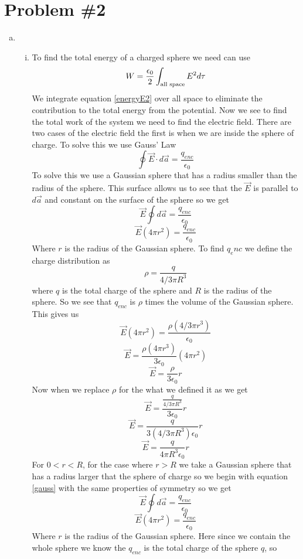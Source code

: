 \documentclass[11pt]{article}
\numberwithin{equation}{section}
\newcommand{\vecE}{\vec{E}}
\begin{document}
\section{Problem \#2}
\begin{enumerate}[(a)]
\item
\begin{enumerate}[(i)]
\item
To find the total energy of a charged sphere we need can use 
\begin{equation}
W = \frac{\epsilon_0}{2} \int_{\textnormal{all space}} E^2 d\tau
\label{energyE2}
\end{equation}
We integrate equation \ref{energyE2} over all space to eliminate the contribution to the total energy from the potential. Now we see to find the total work of the system we need to find the electric field. There are two cases of the electric field the first is when we are inside the sphere of charge. To solve this we use Gauss' Law
\begin{equation}
\oint \vecE\cdot d\vec{a} = \frac{q_{enc}}{\epsilon_0}
\label{gauss}
\end{equation}
To solve this we use a Gaussian sphere that has a radius smaller than the radius of the sphere. This surface allows us to see that the $\vecE$ is parallel to $d\vec{a}$ and constant on the surface of the sphere so we get
$$\vecE\oint d\vec{a} = \frac{q_{enc}}{\epsilon_0}$$
$$\vecE(4\pi r^2) = \frac{q_{enc}}{\epsilon_0}$$
Where $r$ is the radius of the Gaussian sphere. To find $q_enc$ we define the charge distribution as
$$\rho = \frac{q}{4/3 \pi R^3}$$
where $q$ is the total charge of the sphere and $R$ is the radius of the sphere. So we see that $q_{enc}$ is $\rho$ times the volume of the Gaussian sphere. This gives us
$$\vecE(4\pi r^2) = \frac{\rho(4/3\pi r^3)}{\epsilon_0}$$
$$\vecE= \frac{\rho(4\pi r^3)}{3\epsilon_0}(4\pi r^2) $$
$$\vecE= \frac{\rho}{3\epsilon_0}r$$
Now when we replace $\rho$ for the what we defined it as we get
$$\vecE= \frac{\frac{q}{4/3 \pi R^3}}{3\epsilon_0}r$$
$$\vecE= \frac{q}{3(4/3 \pi R^3)\epsilon_0}r$$
\begin{equation}
\vecE= \frac{q}{4\pi R^3\epsilon_0}r
\label{Ein}
\end{equation}
For $0<r<R$, for the case where $r>R$ we take a Gaussian sphere that has a radius larger that the sphere of charge so we begin with equation \ref{gauss} with the same properties of symmetry so we get 
$$\vecE\oint d\vec{a} = \frac{q_{enc}}{\epsilon_0}$$
$$\vecE(4\pi r^2) = \frac{q_{enc}}{\epsilon_0}$$
Where $r$ is the radius of the Gaussian sphere. Here since we contain the whole sphere we know the $q_{enc}$ is the total charge of the sphere $q$, so

\end{enumerate}
\end{enumerate}
\end{document}

